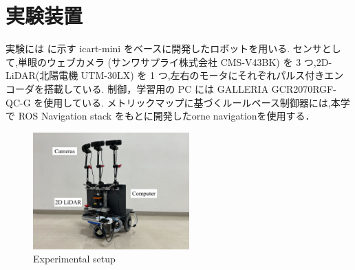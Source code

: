 \section{実験装置}
実験には  に示す icart-mini\cite{icart} をベースに開発したロボットを用いる.
センサとして,単眼のウェブカメラ (サンワサプライ株式会社 CMS-V43BK) を 3 つ,2D-LiDAR(北陽電機 UTM-30LX) を 1 つ,左右のモータにそれぞれパルス付きエンコーダを搭載している.
制御，学習用の PC には GALLERIA GCR2070RGF-QC-G を使用している.
メトリックマップに基づくルールベース制御器には,本学で ROS Navigation stack をもとに開発したorne navigation\cite{orne_nav}を使用する．

\begin{figure}[htbp]
    \centering
     \includegraphics[width=60mm]{images/pdf/ishiguro/gamma.pdf}
     \caption{Experimental setup}
     \label{fig:gamma}
\end{figure}